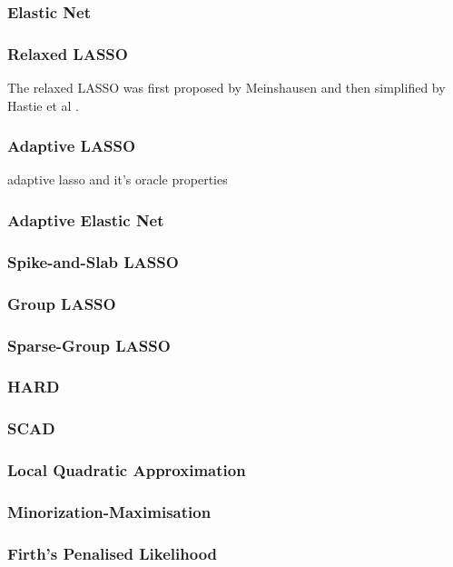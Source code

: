 \subsubsection{Elastic Net}
\subsubsection{Relaxed LASSO}

The relaxed LASSO was first proposed by Meinshausen  and then simplified by Hastie et al .

\subsubsection{Adaptive LASSO}
adaptive lasso and it's oracle properties
\subsubsection{Adaptive Elastic Net}
\subsubsection{Spike-and-Slab LASSO}
\subsubsection{Group LASSO}

\subsubsection{Sparse-Group LASSO}
\subsubsection{HARD}
\subsubsection{SCAD}
\subsubsection{Local Quadratic Approximation}
\subsubsection{Minorization-Maximisation}
\subsubsection{Firth's Penalised Likelihood}

